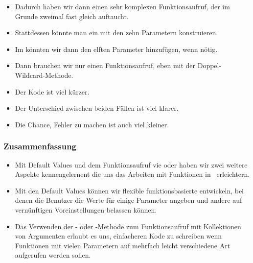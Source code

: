 \documentclass[aspectratio=169,mathserif,notheorems]{beamer}%
\begin{document}
\begin{frame}[t]
\begin{itemize}
%
\item<13-> Dadurch haben wir dann einen sehr komplexen Funktionsaufruf, der im Grunde zweimal fast gleich auftaucht.%
%
\item<14-> Stattdessen könnte man ein  mit den zehn Parametern konstruieren.%
%
\item<15-> Im  könnten wir dann den elften Parameter hinzufügen, wenn nötig.%
%
\item<16-> Dann brauchen wir nur einen Funktionsaufruf, eben mit der Doppel-Wildcard-Methode.
%
\item<17-> Der Kode ist viel kürzer.%
%
\item<18-> Der Unterschied zwischen beiden Fällen ist viel klarer.%
%
\item<19-> Die Chance, Fehler zu machen ist auch viel kleiner.%
%
\end{itemize}%
\end{frame}%
%
\begin{frame}%
\frametitle{Zusammenfassung}%
\begin{itemize}%
%
\item Mit Default Values und dem Funktionsaufruf vie \pythonil{*} oder \pythonil{**} haben wir zwei weitere Aspekte kennengelernent die uns das Arbeiten mit Funktionen in \python\ erleichtern.%
%
\item<2-> Mit den Default Values können wir flexible funktionsbasierte  entwickeln, bei denen die Benutzer die Werte für einige Parameter angeben und andere auf vernünftigen Voreinstellungen belassen können.%
%
\item<3-> Das Verwenden der \pythonil{*}- oder \pythonil{**}-Methode zum Funktionsaufruf mit Kollektionen von Argumenten erlaubt es uns, einfacheren Kode zu schreiben wenn Funktionen mit vielen Parametern auf mehrfach leicht verschiedene Art aufgerufen werden sollen.%
%
\end{itemize}%
\end{frame}%
%
\endPresentation%
\end{document}
